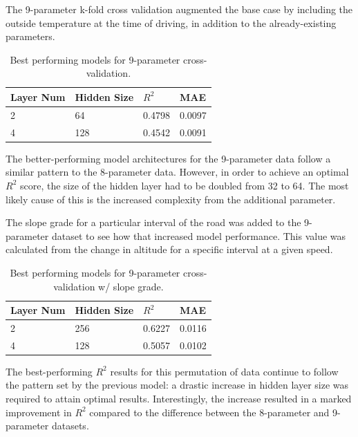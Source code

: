 \documentclass[letterpaper]{article}
\begin{document}
The 9-parameter k-fold cross validation augmented the base case by 
including the outside temperature at the time of driving, in addition to 
the already-existing parameters.

\begin{table}[]
    \begin{tabular}{|l|l|l|l|}
        \hline
        \textbf{Layer Num} & \textbf{Hidden Size} & \textbf{$R^{2}$} & \textbf{MAE} \\
        \hline
        2              	& 64               	& 0.4798  	& 0.0097   	\\
        4              	& 128              	& 0.4542  	& 0.0091 	\\
        \hline
    \end{tabular}
    \caption{Best performing models for 9-parameter cross-validation.}
    \label{tab:tb2}
\end{table}

The better-performing model architectures for the 9-parameter data follow 
a similar pattern to the 8-parameter data. However, in order to achieve an 
optimal $R^{2}$ score, the size of the hidden layer had to be doubled from 
32 to 64. The most likely cause of this is the increased complexity from 
the additional parameter.

The slope grade for a particular interval of the road was added to the 
9-parameter dataset to see how that increased model performance. This 
value was calculated from the change in altitude for a specific interval 
at a given speed.

\begin{table}[]
    \begin{tabular}{|l|l|l|l|}
        \hline
        \textbf{Layer Num} & \textbf{Hidden Size} & \textbf{$R^{2}$} & \textbf{MAE} \\
        \hline
        2              	& 256              	& 0.6227  	& 0.0116   	\\
        4              	& 128              	& 0.5057  	& 0.0102 	\\
        \hline 
    \end{tabular}
    \caption{Best performing models for 9-parameter cross-validation w/ slope grade.}
    \label{tab:tb3}
\end{table}

The best-performing $R^{2}$ results for this permutation of data continue 
to follow the pattern set by the previous model: a drastic increase in 
hidden layer size was required to attain optimal results. Interestingly, 
the increase resulted in a marked improvement in $R^{2}$ compared to the 
difference between the 8-parameter and 9-parameter datasets.
\end{document}

